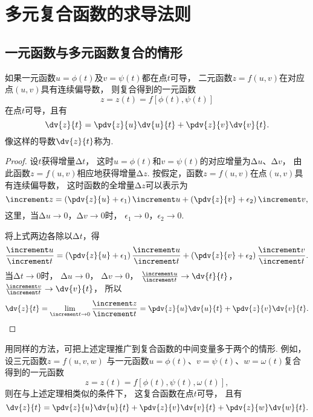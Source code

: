 \section{多元复合函数的求导法则}
\subsection{一元函数与多元函数复合的情形}
\begin{theorem}
如果一元函数\(u=\phi(t)\)及\(v=\psi(t)\)都在点\(t\)可导，
二元函数\(z=f(u,v)\)在对应点\((u,v)\)具有连续偏导数，
则复合得到的一元函数\begin{equation*}
	z = z(t) = f[\phi(t),\psi(t)]
\end{equation*}
在点\(t\)可导，且有\begin{equation*}
	\dv{z}{t} = \pdv{z}{u}\dv{u}{t} + \pdv{z}{v}\dv{v}{t}.
\end{equation*}
像这样的导数\(\dv{z}{t}\)称为.
\begin{proof}
\def\D#1#2{\frac{\increment #1}{\increment #2}}
设\(t\)获得增量\(\increment t\)，
这时\(u=\phi(t)\)和\(v=\psi(t)\)的对应增量为\(\increment u\)、\(\increment v\)，
由此函数\(z=f(u,v)\)相应地获得增量\(\increment z\).
按假定，函数\(z=f(u,v)\)在点\((u,v)\)具有连续偏导数，
这时函数的全增量\(\increment z\)可以表示为
\begin{equation*}
	\increment z
	= \left(\pdv{z}{u} + \epsilon_1\right) \increment u
	+ \left(\pdv{z}{v} + \epsilon_2\right) \increment v,
\end{equation*}
这里，当\(\increment u\to0\)，\(\increment v\to0\)时，
\(\epsilon_1\to0\)，\(\epsilon_2\to0\).

将上式两边各除以\(\increment t\)，得\begin{equation*}
	\D{u}{t}
	= \left(\pdv{z}{u} + \epsilon_1\right) \D{u}{t}
	+ \left(\pdv{z}{v} + \epsilon_2\right) \D{v}{t}.
\end{equation*}
当\(\increment t\to0\)时，
\(\increment u\to0\)，
\(\increment v\to0\)，
\(\D{u}{t} \to \dv{t}{t}\)，
\(\D{v}{t} \to \dv{v}{t}\)，
所以\begin{equation*}
	\dv{z}{t} = \lim_{\increment t\to0}{\D{z}{t}}
	= \pdv{z}{u} \dv{u}{t} + \pdv{z}{v} \dv{v}{t}.
	\qedhere
\end{equation*}
\end{proof}
\end{theorem}
用同样的方法，可把上述定理推广到复合函数的中间变量多于两个的情形.
例如，设三元函数\(z=f(u,v,w)\)
与一元函数\(u=\phi(t)\)、\(v=\psi(t)\)、\(w=\omega(t)\)复合得到的一元函数\begin{equation*}
	z = z(t) = f[\phi(t),\psi(t),\omega(t)],
\end{equation*}
则在与上述定理相类似的条件下，
这复合函数在点\(t\)可导，
且有\begin{equation*}
	\dv{z}{t} = \pdv{z}{u}\dv{u}{t} + \pdv{z}{v}\dv{v}{t} + \pdv{z}{w}\dv{w}{t}.
\end{equation*}

